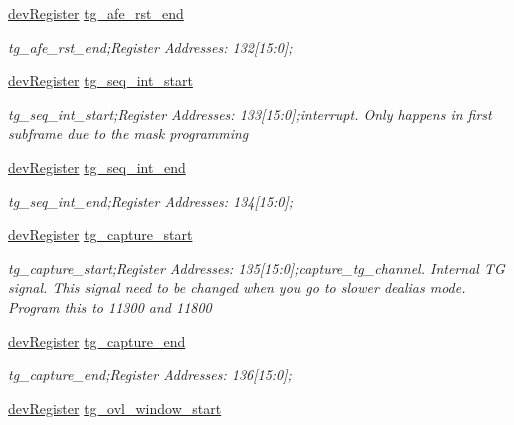 \begin{DoxyCompactItemize}
\mbox{\hyperlink{classdev_register}{dev\+Register}} \mbox{\hyperlink{class_o_p_t3101_registers_af170807207608e397f4e8a661cc68161}{tg\+\_\+afe\+\_\+rst\+\_\+end}}
\begin{DoxyCompactList}\small\item\em tg\+\_\+afe\+\_\+rst\+\_\+end;Register Addresses\+: 132\mbox{[}15\+:0\mbox{]}; \end{DoxyCompactList}\item 
\mbox{\hyperlink{classdev_register}{dev\+Register}} \mbox{\hyperlink{class_o_p_t3101_registers_aa7e605c8b696f7ebbf39ca38269fa5fb}{tg\+\_\+seq\+\_\+int\+\_\+start}}
\begin{DoxyCompactList}\small\item\em tg\+\_\+seq\+\_\+int\+\_\+start;Register Addresses\+: 133\mbox{[}15\+:0\mbox{]};interrupt. Only happens in first subframe due to the mask programming \end{DoxyCompactList}\item 
\mbox{\hyperlink{classdev_register}{dev\+Register}} \mbox{\hyperlink{class_o_p_t3101_registers_ab90cbacab0668a970a5ff91f476a7496}{tg\+\_\+seq\+\_\+int\+\_\+end}}
\begin{DoxyCompactList}\small\item\em tg\+\_\+seq\+\_\+int\+\_\+end;Register Addresses\+: 134\mbox{[}15\+:0\mbox{]}; \end{DoxyCompactList}\item 
\mbox{\hyperlink{classdev_register}{dev\+Register}} \mbox{\hyperlink{class_o_p_t3101_registers_aae5d310de6a3870222106321e548b5a0}{tg\+\_\+capture\+\_\+start}}
\begin{DoxyCompactList}\small\item\em tg\+\_\+capture\+\_\+start;Register Addresses\+: 135\mbox{[}15\+:0\mbox{]};capture\+\_\+tg\+\_\+channel. Internal TG signal. This signal need to be changed when you go to slower dealias mode. Program this to 11300 and 11800 \end{DoxyCompactList}\item 
\mbox{\hyperlink{classdev_register}{dev\+Register}} \mbox{\hyperlink{class_o_p_t3101_registers_aed4469099a9148f947df41aa86991b4c}{tg\+\_\+capture\+\_\+end}}
\begin{DoxyCompactList}\small\item\em tg\+\_\+capture\+\_\+end;Register Addresses\+: 136\mbox{[}15\+:0\mbox{]}; \end{DoxyCompactList}\item 
\mbox{\hyperlink{classdev_register}{dev\+Register}} \mbox{\hyperlink{class_o_p_t3101_registers_ad8e5c7ee607fba0138fab34182e47c83}{tg\+\_\+ovl\+\_\+window\+\_\+start}}

\end{DoxyCompactItemize}
